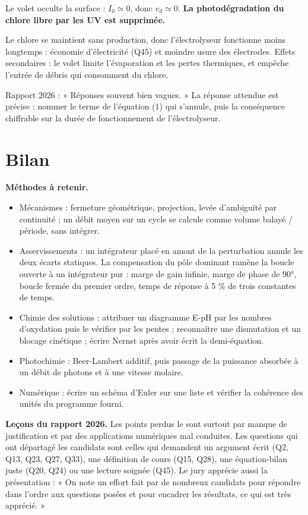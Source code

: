 \documentclass[11pt,a4paper]{article}
\providecommand{\tightlist}{\setlength{\itemsep}{0pt}\setlength{\parskip}{0pt}}
\begin{document}
Le volet occulte la surface : \(I_0\simeq0\), donc \(v_d\simeq0\). \textbf{La photodégradation du chlore libre par les UV est supprimée.}

Le chlore se maintient sans production, donc l'électrolyseur fonctionne moins longtemps : économie d'électricité (Q45) et moindre usure des électrodes. Effets secondaires : le volet limite l'évaporation et les pertes thermiques, et empêche l'entrée de débris qui consomment du chlore.

\begin{jury}

Rapport 2026 : « Réponses souvent bien vagues. » La réponse attendue est précise : nommer le terme de l'équation (1) qui s'annule, puis la conséquence chiffrable sur la durée de fonctionnement de l'électrolyseur.

\end{jury}

\hypertarget{bilan}{%
\section{Bilan}\label{bilan}}

\textbf{Méthodes à retenir.}

\begin{itemize}
\tightlist
\item
  Mécanismes : fermeture géométrique, projection, levée d'ambiguïté par continuité ; un débit moyen sur un cycle se calcule comme volume balayé / période, sans intégrer.
\item
  Asservissements : un intégrateur placé en amont de la perturbation annule les deux écarts statiques. La compensation du pôle dominant ramène la boucle ouverte à un intégrateur pur : marge de gain infinie, marge de phase de 90°, boucle fermée du premier ordre, temps de réponse à 5 \% de trois constantes de temps.
\item
  Chimie des solutions : attribuer un diagramme E-pH par les nombres d'oxydation puis le vérifier par les pentes ; reconnaître une dismutation et un blocage cinétique ; écrire Nernst après avoir écrit la demi-équation.
\item
  Photochimie : Beer-Lambert additif, puis passage de la puissance absorbée à un débit de photons et à une vitesse molaire.
\item
  Numérique : écrire un schéma d'Euler sur une liste et vérifier la cohérence des unités du programme fourni.
\end{itemize}

\textbf{Leçons du rapport 2026.} Les points perdus le sont surtout par manque de justification et par des applications numériques mal conduites. Les questions qui ont départagé les candidats sont celles qui demandent un argument écrit (Q2, Q13, Q23, Q27, Q33), une définition de cours (Q15, Q28), une équation-bilan juste (Q20, Q24) ou une lecture soignée (Q45). Le jury apprécie aussi la présentation : « On note un effort fait par de nombreux candidats pour répondre dans l'ordre aux questions posées et pour encadrer les résultats, ce qui est très apprécié. »
\end{document}
